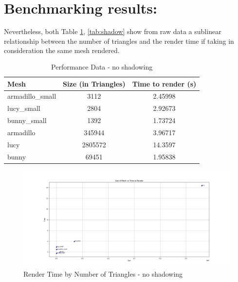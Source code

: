 \documentclass{article}
\begin{document}
\section*{Benchmarking results:}

Nevertheless, both Table \ref{tab:no-shadow}, \ref{tab:shadow} show from raw data a sublinear relationship
between the number of triangles and the render time if taking in consideration the same mesh rendered.\\


\begin{table}[h]
  \centering
  \caption{Performance Data - no shadowing}
  \label{tab:no-shadow}
  \begin{tabular}{lcc}
    \toprule
    \textbf{Mesh}    & \textbf{Size (in Triangles)} & \textbf{Time to render (s)} \\
    \midrule
    armadillo\_small & 3112                         & 2.45998                     \\
    lucy\_small      & 2804                         & 2.92673                     \\
    bunny\_small     & 1392                         & 1.73724                     \\
    armadillo        & 345944                       & 3.96717                     \\
    lucy             & 2805572                      & 14.3597                     \\
    bunny            & 69451                        & 1.95838                     \\
    \bottomrule
  \end{tabular}
\end{table}


\begin{figure}[H]
  \caption{Render Time by Number of Triangles - no shadowing}
  \includegraphics[width=\linewidth, trim={5cm 0cm 4cm 0cm}, clip]{Figure_1.png}
\end{figure}
\end{document}
